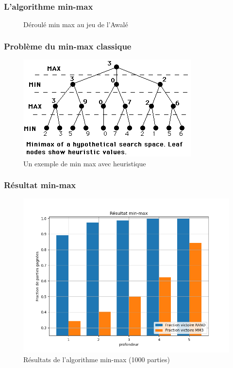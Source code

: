 \documentclass{beamer}
\begin{document}
\begin{frame}
  \frametitle{L'algorithme min-max}
  \begin{figure}
    \centering
    
    \caption{Déroulé min max au jeu de l'Awalé }
  \end{figure}
\end{frame}


\begin{frame}
  \frametitle{Problème du min-max classique}
  \begin{figure}
    \centering
    \includegraphics[width=0.8\linewidth]{ressources/min_max_heuristique.png}
    \caption{Un exemple de min max avec heuristique}
  \end{figure}
\end{frame}

\begin{frame}
  \frametitle{Résultat min-max}
  \begin{figure}
    \centering
    \includegraphics[width=0.75\linewidth]{ressources/resultat_min_max.png}
    \caption{Résultats de l'algorithme min-max (1000 parties)}
  \end{figure}
\end{frame}
\end{document}
